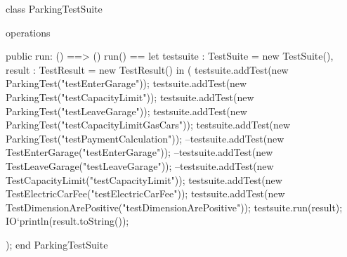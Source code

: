 \documentclass[a4paper]{article}
\begin{document}
\title{}
\author{}
\begin{vdm_al}
class ParkingTestSuite

operations
    
    public run: () ==> ()
    run() ==
        let testsuite : TestSuite = new TestSuite(),
            result : TestResult = new TestResult() 
        in
        (
            testsuite.addTest(new ParkingTest("testEnterGarage"));
            testsuite.addTest(new ParkingTest("testCapacityLimit"));
            testsuite.addTest(new ParkingTest("testLeaveGarage"));
            testsuite.addTest(new ParkingTest("testCapacityLimitGasCars"));
            testsuite.addTest(new ParkingTest("testPaymentCalculation"));
            --testsuite.addTest(new TestEnterGarage("testEnterGarage"));
            --testsuite.addTest(new TestLeaveGarage("testLeaveGarage"));
            --testsuite.addTest(new TestCapacityLimit("testCapacityLimit"));
            testsuite.addTest(new TestElectricCarFee("testElectricCarFee"));
            testsuite.addTest(new TestDimensionArePositive("testDimensionArePositive"));
            testsuite.run(result);
            IO`println(result.toString());
        
        );
end ParkingTestSuite
\end{vdm_al}
\end{document}
